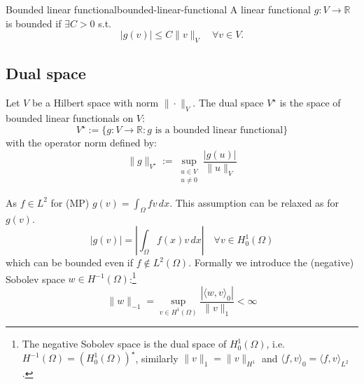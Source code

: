 \begin{definition}{Bounded linear functional}{bounded-linear-functional}
    A linear functional $g: V \to \mathbb{R}$ is bounded if $\exists C > 0$ s.t.
    \[
        |g(v)| \leq C \|v\|_V \quad \forall v \in V.
    \]
\end{definition}

\subsection{Dual space}
Let $V$ be a Hilbert space with norm $\|\cdot\|_V$. The dual space $V^\star$ is the space of bounded linear functionals on $V$:
\[
    V^\star := \{g: V \to \mathbb{R} : g \text{ is a bounded linear functional}\}
\]
with the operator norm defined by:
\[
    \|g\|_{V^\star} := \sup_{\substack{u \in V \\ u \neq 0}} \frac{|g(u)|}{\|u\|_V}
\]

As $f \in L^2$ for (MP) $g(v) = \int_\Omega f v \, dx$.
This assumption can be relaxed as for $g(v)$.
\[
    |g(v)| = \left|\int_\Omega f(x) v \, dx\right| \quad \forall v \in H_0^1(\Omega)
\]
which can be bounded even if $f \notin L^2(\Omega)$.
Formally we introduce the (negative) Sobolev space $w \in H^{-1}(\Omega)$:\footnote{The negative Sobolev space is the dual space of $H_0^1(\Omega)$, i.e. $H^{-1}(\Omega) = (H_0^1(\Omega))^\star$, similarly $\|v\|_1 = \|v\|_{H^1}$ and $\langle f, v \rangle_0 = \langle f, v \rangle_{L^2}$.}
\[
    \|w\|_{-1} = \sup_{v \in H^1(\Omega)} \frac{|\langle w, v \rangle_0|}{\|v\|_{1}} < \infty
\]

